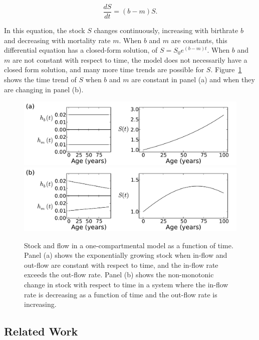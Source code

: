\[
\frac{dS}{dt} = (b - m)S.
\]

In this equation, the stock $S$ changes continuously, increasing with
birthrate $b$ and decreasing with mortality rate $m$. When $b$ and $m$
are constants, this differential equation has a closed-form solution,
of $S = S_0 e^{(b-m)t}$. When $b$ and $m$ are not constant with
respect to time, the model does not necessarily have a closed form
solution, and many more time trends are possible for $S$.
Figure~\ref{forward-sim-one-compartment-soln} shows the time trend of
$S$ when $b$ and $m$ are constant in panel (a) and when they are
changing in panel (b).

\begin{figure}[h]
\begin{center}
\includegraphics[width=\textwidth]{one_compartment_constant_rate.pdf}
\includegraphics[width=\textwidth]{one_compartment_varying_rate.pdf}
\caption{Stock and flow in a one-compartmental model as a function of
  time. Panel (a) shows the exponentially growing stock when in-flow
  and out-flow are constant with respect to time, and the in-flow rate
  exceeds the out-flow rate.  Panel (b) shows the non-monotonic change
  in stock with respect to time in a system where the in-flow rate is
  decreasing as a function of time and the out-flow rate is
  increasing.}
\label{forward-sim-one-compartment-soln}
\end{center}
\end{figure}


\subsection{Related Work}

